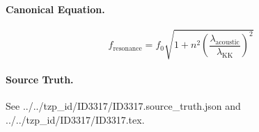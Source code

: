 \paragraph{Canonical Equation.}
\[
\begin{equation} f_ \text{resonance} = f_0 \sqrt{1 + n^2 \left( \frac{ \lambda_ \text{acoustic}}{ \lambda_ \text{KK}} \right)^2} \end{equation}
\]

\paragraph{Source Truth.}
See ../../tzp\_id/ID3317/ID3317.source\_truth.json and ../../tzp\_id/ID3317/ID3317.tex.
